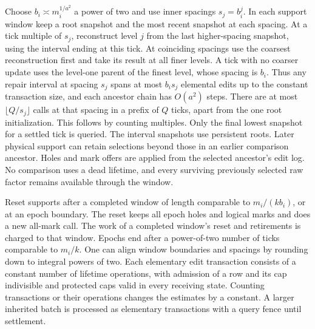 \documentclass[11pt]{article}
\begin{document}
Choose \(b_i\asymp m_i^{1/a^2}\) a power of two and use inner spacings \(s_j=b_i^j\). In each support window keep a root snapshot and the most recent snapshot at each spacing. At a tick multiple of \(s_j\), reconstruct level \(j\) from the last higher-spacing snapshot, using the interval ending at this tick. At coinciding spacings use the coarsest reconstruction first and take its result at all finer levels. A tick with no coarser update uses the level-one parent of the finest level, whose spacing is \(b_i\). Thus any repair interval at spacing \(s_j\) spans at most \(b_i s_j\) elemental edits up to the constant transaction size, and each ancestor chain has \(O(a^2)\) steps. There are at most \(\lfloor Q/s_j\rfloor\) calls at that spacing in a prefix of \(Q\) ticks, apart from the one root initialization. This follows by counting multiples. Only the final lowest snapshot for a settled tick is queried. The interval snapshots use persistent roots. Later physical support can retain selections beyond those in an earlier comparison ancestor. Holes and mark offers are applied from the selected ancestor's edit log. No comparison uses a dead lifetime, and every surviving previously selected raw factor remains available through the window.

Reset supports after a completed window of length comparable to \(m_i/(k b_i)\), or at an epoch boundary. The reset keeps all epoch holes and logical marks and does a new all-mark call. The work of a completed window's reset and retirements is charged to that window. Epochs end after a power-of-two number of ticks comparable to \(m_i/k\). One can align window boundaries and spacings by rounding down to integral powers of two. Each elementary edit transaction consists of a constant number of lifetime operations, with admission of a row and its cap indivisible and protected caps valid in every receiving state. Counting transactions or their operations changes the estimates by a constant. A larger inherited batch is processed as elementary transactions with a query fence until settlement.
\end{document}
